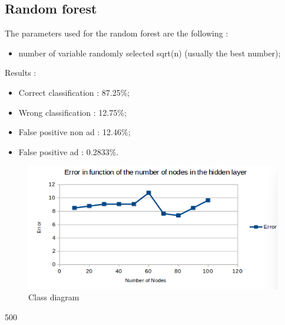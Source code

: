 \subsection{Random forest}
The parameters used for the random forest are the following :
  \begin{itemize}
    \item number of variable randomly selected sqrt(n) (usually the best number);
  \end{itemize}
Results :
\begin{itemize}
  \item Correct classification : 87.25\%;
  \item Wrong classification : 12.75\%;
  \item False positive non ad : 12.46\%;
  \item False positive ad : 0.2833\%.
\end{itemize}

\begin{figure}[h]
 \centering
 \includegraphics[scale=0.5]{../images/NNPO.png}
 \caption{Class diagram}
\end{figure}
500
